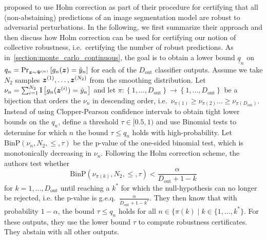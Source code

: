 \citet{Fischer2021} proposed to use Holm correction as part of their procedure for certifying that all (non-abstaining) predictions of an image segmentation model are robust to adversarial perturbations.
In the following, we first summarize their approach and then discuss how Holm correction can be used for certifying our notion of collective robustness, i.e.~certifying the number of robust predictions.
As in~\autoref{section:monte_carlo_continuous}, the goal is to obtain a lower bound $\underline{q}_n$ on $q_n = \Pr_{{\bm{z}} \sim \Psi^{(n)}} \left[g_n({\bm{z}}) = \hat{{y}}_n\right]$ for each of the $D_\mathrm{out}$ classifier outputs.
Assume we take $N_2$ samples ${\bm{z}}^{(1)},\dots,{\bm{z}}^{(N_2)}$ from the smoothing distribution.
Let $\nu_n = \sum_{i=1}^{N_2} \mathrm{I}\left[g_n({\bm{z}}^{(i)}) =  \hat{{y}}_n\right]$ 
and let $\pi : \left\{1,\dots,D_\mathrm{out}\right\} \rightarrow \left\{1,\dots,D_\mathrm{out}\right\}$ be a bijection that orders the $\nu_n$ in descending order, i.e.~$\nu_{\pi(1)} \geq \nu_{\pi(2)} \dots \geq \nu_{\pi(D_\mathrm{out})}$.
Instead of using Clopper-Pearson confidence intervals to obtain tight lower bounds on the $q_n$, \citet{Fischer2021} define a threshold $\tau \in [0.5,1)$ and use Binomial tests to determine for which $n$ the bound $\tau \leq q_n$ holds with high-probability.
Let $\mathrm{BinP}\left(\nu_n, N_2, \leq, \tau \right)$ be the p-value of the one-sided binomial test, which is monotonically decreasing in $\nu_n$.
Following the Holm correction scheme, the authors test whether
\begin{equation}
    \mathrm{BinP}\left(\nu_{\pi(k)}, N_2, \leq, \tau \right) < \frac{\alpha}{D_\mathrm{out} + 1 - k}
\end{equation}
for $k = 1, \dots, D_\mathrm{out}$ until reaching a $k^{*}$ for which the null-hypothesis can no longer be rejected, i.e. the p-value is g.e.q.\  $\frac{\alpha}{D_\mathrm{out} + 1 - k^{*}}$.
They then know that with probability $1 - \alpha$, the bound $\tau \leq q_n$ holds for all $n \in \{\pi(k) \mid k \in \{1,\dots, k^{*}\}$.
For these outputs, they use the lower bound $\tau$ to compute robustness certificates.
They abstain with all other outputs.

